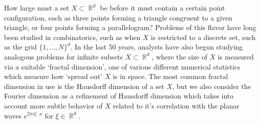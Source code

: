 \documentclass[11pt]{article}
\DeclareMathOperator{\RR}{\mathbb{R}}
\begin{document}
How large must a set $X \subset \RR^d$ be before it must contain a certain point configuration, such as three points forming a triangle congruent to a given triangle, or four points forming a parallelogram? Problems of this flavor have long been studied in combinatorics, such as when $X$ is restricted to a discrete set, such as the grid $\{ 1, \dots, N \}^d$. In the last 50 years, analysts have also begun studying analogous problems for infinite subsets $X \subset \RR^d$, where the size of $X$ is measured via a suitable `fractal dimension', one of various different numerical statistics which measure how `spread out' $X$ is in space. The most common fractal dimension in use is the Hausdorff dimension of a set $X$, but we also consider the Fourier dimension as a refinement of Hausdorff dimension which takes into account more subtle behavior of $X$ related to it's correlation with the planar waves $e^{2 \pi i \xi \cdot x}$ for $\xi \in \RR^d$. 
\end{document}
